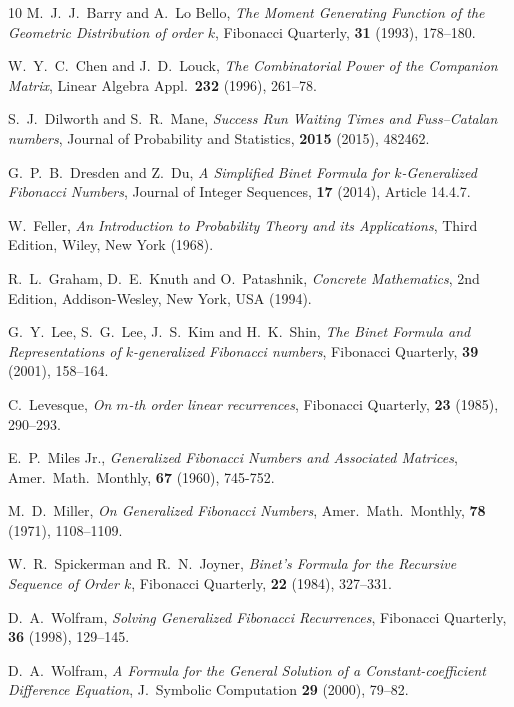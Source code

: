 \documentclass[review]{elsarticle}
\theoremstyle{plain}
\begin{document}

\begin{thebibliography}{10}
M.~J.~J.~Barry and A.~Lo Bello,
\textit{The Moment Generating Function of the Geometric Distribution of order $k$},
Fibonacci Quarterly, \textbf{31} (1993), 178--180.

W.~Y.~C.~Chen and J.~D.~Louck, \textit{The Combinatorial Power of the Companion Matrix},
Linear Algebra Appl.~\textbf{232} (1996), 261--78.

  S.~J.~Dilworth and S.~R.~Mane, \textit{Success Run Waiting Times and Fuss--Catalan numbers},
  Journal of Probability and Statistics, \textbf{2015} (2015), 482462.

  G.~P.~B.~Dresden and Z.~Du, \textit{A Simplified Binet Formula for $k$-Generalized Fibonacci Numbers},
  Journal of Integer Sequences, \textbf{17} (2014), Article 14.4.7.

W.~Feller,
\textit{An Introduction to Probability Theory and its Applications}, Third Edition,
Wiley, New York (1968).

R.~L.~Graham, D.~E.~Knuth and O.~Patashnik,
\textit{Concrete Mathematics}, 2nd Edition,
Addison-Wesley, New York, USA (1994).

  G.~Y.~Lee, S.~G.~Lee, J.~S.~Kim and H.~K.~Shin, \textit{The Binet Formula and Representations of $k$-generalized Fibonacci numbers},
  Fibonacci Quarterly, \textbf{39} (2001), 158--164.

C.~Levesque, \textit{On $m$-th order linear recurrences},
Fibonacci Quarterly, \textbf{23} (1985), 290--293.

  E.~P.~Miles Jr., \textit{Generalized Fibonacci Numbers and Associated Matrices},
  Amer.~Math.~Monthly, \textbf{67} (1960), 745-752.

  M.~D.~Miller, \textit{On Generalized Fibonacci Numbers},
  Amer.~Math.~Monthly, \textbf{78} (1971), 1108--1109.

  W.~R.~Spickerman and R.~N.~Joyner, \textit{Binet's Formula for the Recursive Sequence of Order $k$},
  Fibonacci Quarterly, {\bf 22} (1984), 327--331.

  D.~A.~Wolfram, \textit{Solving Generalized Fibonacci Recurrences},
  Fibonacci Quarterly, \textbf{36} (1998), 129--145.

  D.~A.~Wolfram,
  \textit{A Formula for the General Solution of a Constant-coefficient Difference Equation},
  J.~Symbolic Computation \textbf{29} (2000), 79--82.
  
\end{thebibliography}
\end{document}
